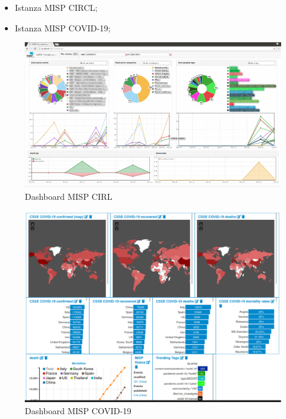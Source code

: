 \begin{itemize}
    \item Istanza MISP CIRCL; 
    \item Istanza MISP COVID-19;
\end{itemize}

\newpage

\begin{figure}[h]
    \begin{center}
        \includegraphics[width=0.85\columnwidth]{images/4_caso_d'uso_img/cirl.png}
    \end{center}
    \caption{Dashboard MISP CIRL}
    \label{fig:Dashboard MISP CIRL}
\end{figure}
        
\begin{figure}[h]
    \begin{center}
        \includegraphics[width=0.85\columnwidth]{images/4_caso_d'uso_img/covid.png}
    \end{center}
    \caption{Dashboard MISP COVID-19}
    \label{fig:Dashboard MISP COVID-19}
\end{figure}       

